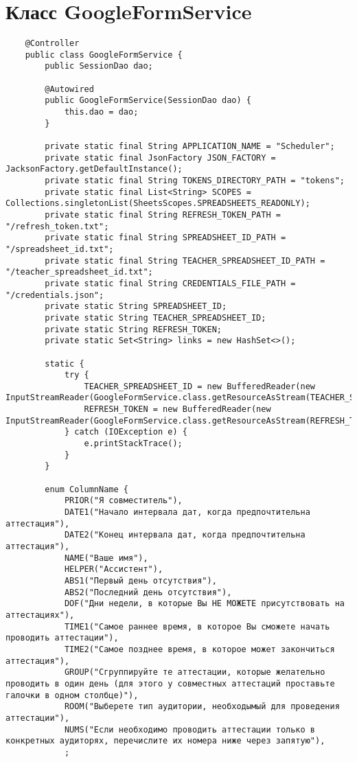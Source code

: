 \chapter{Класс GoogleFormService}\label{appendix-google}	

\begin{lstlisting}
	@Controller
	public class GoogleFormService {
		public SessionDao dao;
		
		@Autowired
		public GoogleFormService(SessionDao dao) {
			this.dao = dao;
		}
		
		private static final String APPLICATION_NAME = "Scheduler";
		private static final JsonFactory JSON_FACTORY = JacksonFactory.getDefaultInstance();
		private static final String TOKENS_DIRECTORY_PATH = "tokens";
		private static final List<String> SCOPES = Collections.singletonList(SheetsScopes.SPREADSHEETS_READONLY);
		private static final String REFRESH_TOKEN_PATH = "/refresh_token.txt";
		private static final String SPREADSHEET_ID_PATH = "/spreadsheet_id.txt";
		private static final String TEACHER_SPREADSHEET_ID_PATH = "/teacher_spreadsheet_id.txt";
		private static final String CREDENTIALS_FILE_PATH = "/credentials.json";
		private static String SPREADSHEET_ID;
		private static String TEACHER_SPREADSHEET_ID;
		private static String REFRESH_TOKEN;
		private static Set<String> links = new HashSet<>();
		
		static {
			try {
				TEACHER_SPREADSHEET_ID = new BufferedReader(new InputStreamReader(GoogleFormService.class.getResourceAsStream(TEACHER_SPREADSHEET_ID_PATH))).readLine();
				REFRESH_TOKEN = new BufferedReader(new InputStreamReader(GoogleFormService.class.getResourceAsStream(REFRESH_TOKEN_PATH))).readLine();
			} catch (IOException e) {
				e.printStackTrace();
			}
		}
		
		enum ColumnName {
			PRIOR("Я совместитель"),
			DATE1("Начало интервала дат, когда предпочтительна аттестация"),
			DATE2("Конец интервала дат, когда предпочтительна аттестация"),
			NAME("Ваше имя"),
			HELPER("Ассистент"),
			ABS1("Первый день отсутствия"),
			ABS2("Последний день отсутствия"),
			DOF("Дни недели, в которые Вы НЕ МОЖЕТЕ присутствовать на аттестациях"),
			TIME1("Самое раннее время, в которое Вы сможете начать проводить аттестации"),
			TIME2("Самое позднее время, в которое может закончиться аттестация"),
			GROUP("Сгруппируйте те аттестации, которые желательно проводить в один день (для этого у совместных аттестаций проставьте галочки в одном столбце)"),
			ROOM("Выберете тип аудитории, необходымый для проведения аттестации"),
			NUMS("Если необходимо проводить аттестации только в конкретных аудиторях, перечислите их номера ниже через запятую"),
			;
			

\end{lstlisting}
